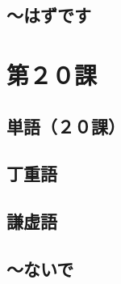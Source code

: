 \documentclass[notoc,notitlepage]{tufte-book}
\begin{document}

\section{〜はずです}%
\label{sec:_hazudesu}





\chapter{第２０課}%
\label{chp:dai_20_ka}

\section{単語（２０課）}%
\label{sec:tango_c20}




\section{丁重語}%
\label{sec:teichougo}




\section{謙虚語}%
\label{sec:kenkyogo}




\section{〜ないで}%
\label{sec:_naide}





\appendix

\backmatter

\fancyhead[LE]{\thepage \enspace \textsl{\leftmark}}



\printindex
\end{document}
